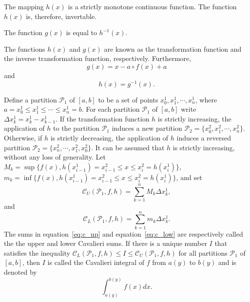 \documentclass[twoside,reqno,11pt]{fcaa-var} %
\begin{document}
\begin{theorem}
The mapping $h(x)$ is a strictly monotone continuous function. The function $h(x)$ is, therefore, invertable.
\end{theorem}

\begin{theorem}
\label{t:inv}
The function $g(x)$ is equal to $h^{-1}(x)$.
\end{theorem}

\noindent
The functions $h(x)$ and $g(x)$ are known as the transformation function and the inverse transformation function, respectively. Furthermore,
\begin{equation}
\label{eq:g_def}
g(x) = x - a\circ f(x) + a 
\end{equation}
and
\begin{equation}
\label{eq:h_def}
h(x) = g^{-1}(x). 
\end{equation}

\begin{definition}\label{def:cav_integral}
Define a partition $\mathcal{P}_1$ of $[a,b]$ to be a set of points $x_0^1, x_1^1,\cdots,x_n^1$, 
where $a = x_0^1 \leq x_1^1 \leq \cdots \leq x_n^1 = b$. For each partition 
$\mathcal{P}_1$ of $[a,b]$ write $\Delta x_k^1 = x_k^1-x_{k-1}^1$. 
If the transformation function $h$ is strictly increasing,
the application of $h$ to the partition $\mathcal{P}_1$ induces a new partition $\mathcal{P}_2 = \{x_0^2, x_1^2,\cdots, x_n^2\}$.
Otherwise, if $h$ is strictly decreasing, the application of $h$ induces a reversed partition $\mathcal{P}_2 = \{x_n^2, \cdots, x_1^2,x_0^2\}$. It
can be assumed that $h$ is strictly increasing, without any loss of generality.  Let 
$M_k = \sup \{f (x), h(x_{i-1}^1) = x_{i-1}^2 \leq x \leq x_i^2 = h(x_i^1)\}$, $m_k = \inf \{f (x), h(x_{i-1}^1) = x_{i-1}^2 \leq x \leq x_i^2 = h(x_i^1)\}$, and set 
\begin{equation}
\label{eq:c_up}
\mathcal{C}_U(\mathcal{P}_1,f,h) = \sum_{k=1}^n M_k \Delta x_k^1, 
\end{equation}
and
\begin{equation}
\label{eq:c_low}
\mathcal{C}_L(\mathcal{P}_1,f,h) = \sum_{k=1}^n m_k \Delta x_k^1. 
\end{equation}
The sums in equation~\eqref{eq:c_up} and equation~\eqref{eq:c_low} are respectively called the the upper and lower Cavalieri sums.
If there is a unique number $I$ that satisfies the inequality $\mathcal{C}_L(\mathcal{P}_1,f,h)\leq I \leq \mathcal{C}_U(\mathcal{P}_1,f,h)$ for all 
partitions $\mathcal{P}_1$ of $[a,b]$, then $I$ is called the Cavalieri integral of $f$ from $a(y)$ to $b(y)$ and is denoted by
\begin{equation}
\int_{a(y)}^{b(y)} f(x) dx.
\end{equation}
\end{definition}
\end{document}
